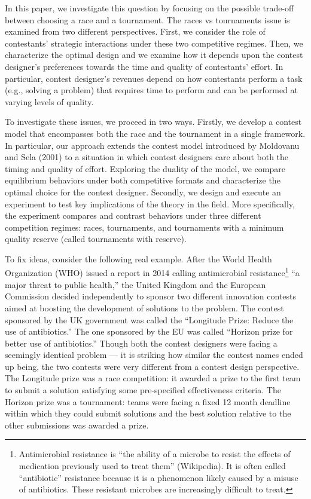\documentclass[10pt, titlepage]{article}
\begin{document}
In this paper, we investigate this question by focusing on the possible
trade-off between choosing a race and a tournament. The races vs
tournaments issue is examined from two different perspectives. First, we
consider the role of contestants' strategic interactions under these two
competitive regimes. Then, we characterize the optimal design and we
examine how it depends upon the contest designer's preferences towards
the time and quality of contestants' effort. In particular, contest
designer's revenues depend on how contestants perform a task (e.g.,
solving a problem) that requires time to perform and can be performed at
varying levels of quality.

To investigate these issues, we proceed in two ways. Firstly, we develop
a contest model that encompasses both the race and the tournament in a
single framework. In particular, our approach extends the contest model
introduced by Moldovanu and Sela (2001) to a situation in which contest
designers care about both the timing and quality of effort. Exploring
the duality of the model, we compare equilibrium behaviors under both
competitive formats and characterize the optimal choice for the contest
designer. Secondly, we design and execute an experiment to test key
implications of the theory in the field. More specifically, the
experiment compares and contrast behaviors under three different
competition regimes: races, tournaments, and tournaments with a minimum
quality reserve (called tournaments with reserve).

To fix ideas, consider the following real example. After the World
Health Organization (WHO) issued a report in 2014 calling antimicrobial
resistance\footnote{Antimicrobial resistance is ``the ability of a
  microbe to resist the effects of medication previously used to treat
  them'' (Wikipedia). It is often called ``antibiotic'' resistance
  because it is a phenomenon likely caused by a misuse of antibiotics.
  These resistant microbes are increasingly difficult to treat.} ``a
major threat to public health,'' the United Kingdom and the European
Commission decided independently to sponsor two different innovation
contests aimed at boosting the development of solutions to the problem.
The contest sponsored by the UK government was called the ``Longitude
Prize: Reduce the use of antibiotics.'' The one sponsored by the EU was
called ``Horizon prize for better use of antibiotics.'' Though both the
contest designers were facing a seemingly identical problem --- it is
striking how similar the contest names ended up being, the two contests
were very different from a contest design perspective. The Longitude
prize was a race competition: it awarded a prize to the first team to
submit a solution satisfying some pre-specified effectiveness criteria.
The Horizon prize was a tournament: teams were facing a fixed 12 month
deadline within which they could submit solutions and the best solution
relative to the other submissions was awarded a prize.
\end{document}
